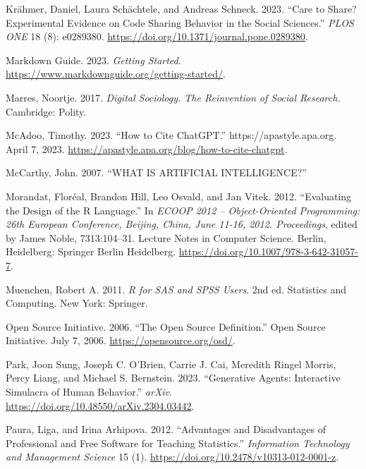 \documentclass[
  letterpaper,
]{scrbook}
\newlength{\cslhangindent}
\newlength{\cslentryspacingunit} %
\newenvironment{CSLReferences}[2] %
 {%
  \setlength{\parindent}{0pt}
  \ifodd #1
  \let\oldpar\par
  \def\par{\hangindent=\cslhangindent\oldpar}
  \fi
  \setlength{\parskip}{#2\cslentryspacingunit}
 }%
 {}
\begin{document}
\begin{CSLReferences}{1}{0}
\leavevmode{}%
Krähmer, Daniel, Laura Schächtele, and Andreas Schneck. 2023. {``Care to
Share? {Experimental} Evidence on Code Sharing Behavior in the Social
Sciences.''} \emph{PLOS ONE} 18 (8): e0289380.
\url{https://doi.org/10.1371/journal.pone.0289380}.

\leavevmode{}%
Markdown Guide. 2023. \emph{Getting {Started}}.
\url{https://www.markdownguide.org/getting-started/}.

\leavevmode{}%
Marres, Noortje. 2017. \emph{Digital {Sociology}. {The Reinvention} of
{Social Research}.} {Cambridge}: {Polity}.

\leavevmode{}%
McAdoo, Timothy. 2023. {``How to Cite {ChatGPT}.''}
{https://apastyle.apa.org}. April 7, 2023.
\url{https://apastyle.apa.org/blog/how-to-cite-chatgpt}.

\leavevmode{}%
McCarthy, John. 2007. {``{WHAT IS ARTIFICIAL INTELLIGENCE}?''}

\leavevmode{}%
Morandat, Floréal, Brandon Hill, Leo Osvald, and Jan Vitek. 2012.
{``Evaluating the {Design} of the {R Language}.''} In \emph{{ECOOP} 2012
-- {Object-Oriented Programming}: 26th {European Conference}, {Beijing},
{China}, {June} 11-16, 2012. {Proceedings}}, edited by James Noble,
7313:104--31. Lecture {Notes} in {Computer Science}. {Berlin,
Heidelberg}: {Springer Berlin Heidelberg}.
\url{https://doi.org/10.1007/978-3-642-31057-7}.

\leavevmode{}%
Muenchen, Robert A. 2011. \emph{R for {SAS} and {SPSS} Users}. 2nd ed.
Statistics and Computing. {New York}: {Springer}.

\leavevmode{}%
Open Source Initiative. 2006. {``The {Open Source Definition}.''} {Open
Source Initiative}. July 7, 2006. \url{https://opensource.org/osd/}.

\leavevmode{}%
Park, Joon Sung, Joseph C. O'Brien, Carrie J. Cai, Meredith Ringel
Morris, Percy Liang, and Michael S. Bernstein. 2023. {``Generative
{Agents}: {Interactive Simulacra} of {Human Behavior}.''} \emph{arXiv}.
\url{https://doi.org/10.48550/arXiv.2304.03442}.

\leavevmode{}%
Paura, Liga, and Irina Arhipova. 2012. {``Advantages and {Disadvantages}
of {Professional} and {Free Software} for {Teaching Statistics}.''}
\emph{Information Technology and Management Science} 15 (1).
\url{https://doi.org/10.2478/v10313-012-0001-z}.


\end{CSLReferences}
\end{document}
